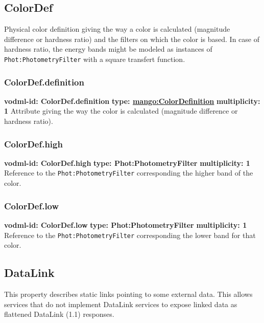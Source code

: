   \subsection{ColorDef}
  \label{sect:ColorDef}
    Physical color definition giving the way a color is calculated (magnitude difference or hardness ratio) and the filters on which the color is based. In case of hardness ratio, the energy bands might be modeled as instances of \texttt{Phot:PhotometryFilter} with a square transfert function.

    \subsubsection{ColorDef.definition}
      \textbf{vodml-id: ColorDef.definition} \newline
      \textbf{type: \hyperref[sect:ColorDefinition]{mango:ColorDefinition}} \newline
      \textbf{multiplicity: 1} \newline
      Attribute giving the way the color is calculated (magnitude difference or hardness ratio).

    \subsubsection{ColorDef.high}
      \textbf{vodml-id: ColorDef.high} \newline
      \textbf{type: Phot:PhotometryFilter} \newline
      \textbf{multiplicity: 1} \newline
      Reference to the \texttt{Phot:PhotometryFilter} \citep{2022ivoa.spec.1101S} corresponding the higher band of the color.

    \subsubsection{ColorDef.low}
      \textbf{vodml-id: ColorDef.low} \newline
      \textbf{type: Phot:PhotometryFilter} \newline
      \textbf{multiplicity: 1} \newline
      Reference to the \texttt{Phot:PhotometryFilter} corresponding the lower band for that color.

  \subsection{DataLink}
  \label{sect:DataLink}
    This property describes static links pointing to some external data. This allows services that do not implement DataLink services to expose linked data as flattened DataLink (1.1) responses.

